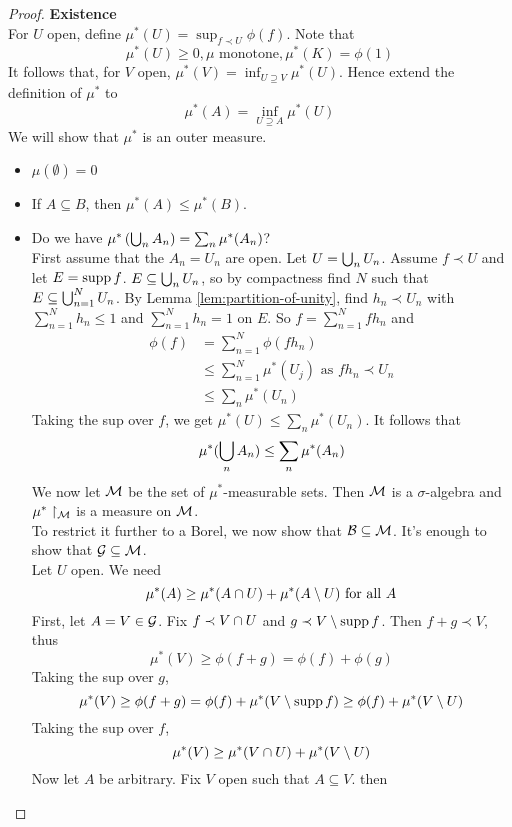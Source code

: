 \documentclass{article}
\begin{document}
\begin{proof}
  {\bf Existence} \\
  For $U$ open, define $\mu^*(U) = \sup_{f \prec U} \phi(f)$. Note that
  $$\mu^*(U) \ge 0, \mu \text{ monotone}, \mu^*(K) = \phi(1)$$
  It follows that, for $V$ open, $\mu^*(V) = \inf_{U \supseteq V} \mu^*(U)$. Hence extend the definition of $\mu^*$ to
  $$\mu^*(A) = \inf_{U \supseteq A} \mu^*(U)$$
  We will show that $\mu^*$ is an outer measure.
  \begin{itemize}
    \item $\mu(\emptyset) = 0$
    \item If $A \subseteq B$, then $\mu^*(A) \le \mu^*(B)$.
    \item Do we have $\mu^*\left(\bigcup_n A_n\right) = \sum_n \mu^*(A_n)$? \\
    First assume that the $A_n = U_n$ are open. Let $U = \bigcup_n U_n$. Assume $f \prec U$ and let $E = \operatorname{supp} f$. $E \subseteq \bigcup_n U_n$, so by compactness find $N$ such that $E \subseteq \bigcup_{n = 1}^N U_n$. By Lemma \ref{lem:partition-of-unity}, find $h_n \prec U_n$ with $\sum_{n = 1}^N h_n \le 1$ and $\sum_{n = 1}^N h_n = 1$ on $E$. So $f = \sum_{n = 1}^N fh_n$ and
    \begin{align*}
      \phi(f)
      & = \sum_{n = 1}^N \phi(fh_n) \\
      & \le \sum_{n = 1}^N \mu^*(U_j) \text{ as } fh_n \prec U_n \\
      & \le \sum_n \mu^*(U_n)
    \end{align*}
    Taking the sup over $f$, we get $\mu^*(U) \le \sum_n \mu^*(U_n)$. It follows that
    $$\mu^*(\bigcup_n A_n) \le \sum_n \mu^*(A_n)$$
    We now let $\mathcal M$ be the set of $\mu^*$-measurable sets. Then $\mathcal M$ is a $\sigma$-algebra and $\mu^*\restriction_{\mathcal M}$ is a measure on $\mathcal M$. \\
    To restrict it further to a Borel, we now show that $\mathcal B \subseteq \mathcal M$. It's enough to show that $\mathcal G \subseteq \mathcal M$. \\
    Let $U$ open. We need
    $$\mu^*(A) \ge \mu^*(A \cap U) + \mu^*(A \setminus U) \text{ for all } A$$
    First, let $A = V \in \mathcal G$. Fix $f \prec V \cap U$ and $g \prec V \setminus \operatorname{supp} f$. Then $f + g \prec V$, thus
    $$\mu^*(V) \ge \phi(f + g) = \phi(f) + \phi(g)$$
    Taking the sup over $g$,
    $$\mu^*(V) \ge \phi(f + g) = \phi(f) + \mu^*(V \setminus \operatorname{supp} f) \ge \phi(f) + \mu^*(V \setminus U)$$
    Taking the sup over $f$,
    $$\mu^*(V) \ge \mu^*(V \cap U) + \mu^*(V \setminus U)$$
    Now let $A$ be arbitrary. Fix $V$ open such that $A \subseteq V$. then

\end{itemize}
\end{proof}
\end{document}

